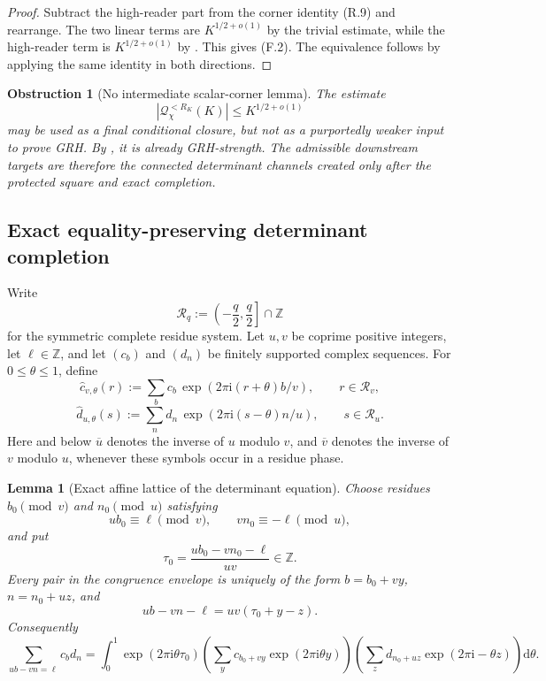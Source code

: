\documentclass[11pt]{article}
\newtheorem{lemma}[theorem]{Lemma}
\newtheorem{obstruction}[theorem]{Obstruction}
\theoremstyle{definition}
\theoremstyle{remark}
\newcommand{\Z}{\mathbb Z}
\newcommand{\dd}{\mathrm d}
\newcommand{\ee}[1]{\exp(2\pi\mathrm i #1)}
\begin{document}
\begin{proof}
Subtract the high-reader part from the corner identity
\textup{(R.9)} and rearrange.  The two linear terms are
$K^{1/2+o(1)}$ by the trivial estimate, while the high-reader term is
$K^{1/2+o(1)}$ by .  This gives
\textup{(F.2)}.  The equivalence follows by applying the same identity in both
directions.
\end{proof}

\begin{obstruction}[No intermediate scalar-corner lemma]
\label{obs:freq-scalar-circular}
The estimate
\[
 |\mathcal Q_\chi^{<R_K}(K)|\le K^{1/2+o(1)}
\]
may be used as a final conditional closure, but not as a purportedly weaker
input to prove GRH.  By , it is already GRH-strength.
The admissible downstream targets are therefore the connected determinant
channels created only after the protected square and exact completion.
\end{obstruction}

\subsection{Exact equality-preserving determinant completion}

Write
\[
 \mathcal R_q:=\left(-\frac q2,\frac q2\right]\cap\Z
\]
for the symmetric complete residue system.  Let $u,v$ be coprime positive
integers, let $\ell\in\Z$, and let $(c_b)$ and $(d_n)$ be finitely supported
complex sequences.  For $0\le\theta\le1$, define
\[
 \widehat c_{v,\theta}(r)
 :=\sum_b c_b\,\ee{(r+\theta)b/v},
 \qquad r\in\mathcal R_v,
\]
\[
 \widehat d_{u,\theta}(s)
 :=\sum_n d_n\,\ee{(s-\theta)n/u},
 \qquad s\in\mathcal R_u.
 \tag{F.3}
\]
Here and below $\overline u$ denotes the inverse of $u$ modulo $v$, and
$\overline v$ denotes the inverse of $v$ modulo $u$, whenever these symbols
occur in a residue phase.

\begin{lemma}[Exact affine lattice of the determinant equation]
\label{lem:freq-affine-lattice}
Choose residues $b_0\pmod v$ and $n_0\pmod u$ satisfying
\[
 ub_0\equiv\ell\pmod v,
 \qquad
 vn_0\equiv-\ell\pmod u,
\]
and put
\[
 \tau_0=\frac{ub_0-vn_0-\ell}{uv}\in\Z.
\]
Every pair in the congruence envelope is uniquely of the form
$b=b_0+vy$, $n=n_0+uz$, and
\[
 \boxed{ub-vn-\ell=uv(\tau_0+y-z).}
 \tag{F.4}
\]
Consequently
\[
 \sum_{ub-vn=\ell}c_bd_n
 =\int_0^1\ee{\theta\tau_0}
   \left(\sum_yc_{b_0+vy}\ee{\theta y}\right)
   \left(\sum_zd_{n_0+uz}\ee{-\theta z}\right)\dd\theta.
 \tag{F.5}
\]
\end{lemma}
\end{document}
